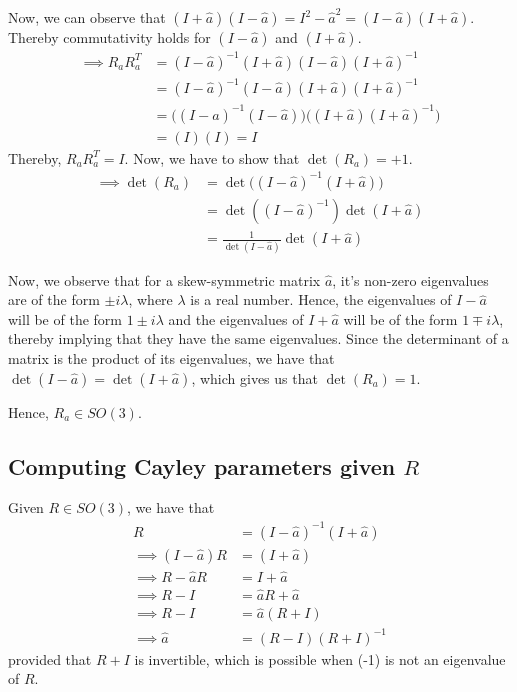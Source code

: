 Now, we can observe that \( (I + \hat{a}) (I - \hat{a}) = I^2 - \hat{a}^2 = (I - \hat{a}) (I + \hat{a}) \).\\
Thereby commutativity holds for \( (I - \hat{a}) \) and \( (I + \hat{a}) \).
\begin{align*}
    \implies
    R_a R_a^T
     & =
    (I - \hat{a})^{-1} (I + \hat{a}) (I - \hat{a}) (I + \hat{a})^{-1}
    \\ & =
    (I - \hat{a})^{-1} (I - \hat{a}) (I + \hat{a}) (I + \hat{a})^{-1}
    \\ & =
    \Big((I - \hat{a})^{-1} (I - \hat{a}) \Big) \Big( (I + \hat{a}) (I + \hat{a})^{-1} \Big)
    \\ & =
    (I)(I)
    = I
\end{align*}
Thereby, \( R_a R_a^T = I \).
Now, we have to show that \( \det(R_a) = +1 \).
\begin{align*}
    \implies
    \det(R_a)
     & = \det \Big( (I - \hat{a})^{-1} (I + \hat{a}) \Big)
    \\ & = \det \left( (I - \hat{a})^{-1} \right) \det (I + \hat{a})
    \\ & = \frac{1}{\det(I - \hat{a})} \det(I + \hat{a})
\end{align*}

Now, we observe that for a skew-symmetric matrix \( \hat{a} \), it's non-zero eigenvalues are of the form \( \pm i \lambda \), where \( \lambda \) is a real number.
Hence, the eigenvalues of \( I - \hat{a} \) will be of the form \( 1 \pm i \lambda \) and the eigenvalues of \( I + \hat{a} \) will be of the form \( 1 \mp i \lambda \), thereby implying that they have the same eigenvalues.
Since the determinant of a matrix is the product of its eigenvalues, we have that \( \det(I - \hat{a}) = \det(I + \hat{a}) \), which gives us that \( \det(R_a) = 1 \).

Hence, \( \boxed{ R_a \in SO(3) } \).

\subsection*{Computing Cayley parameters given \( R \) }

Given \( R \in SO(3) \), we have that
\begin{align*}
    R
     & =
    (I - \hat{a})^{-1} (I + \hat{a})
    \\
    \implies
    (I - \hat{a}) R
     & =
    (I + \hat{a})
    \\
    \implies
    R - \hat{a} R
     & =
    I + \hat{a}
    \\
    \implies
    R - I
     & =
    \hat{a} R + \hat{a}
    \\
    \implies
    R - I
     & =
    \hat{a} (R + I)
    \\
    \implies
    \hat{a}
     & =
    (R - I)(R + I)^{-1}
\end{align*}
provided that \( R + I \) is invertible, which is possible when (-1) is not an eigenvalue of \( R \).

